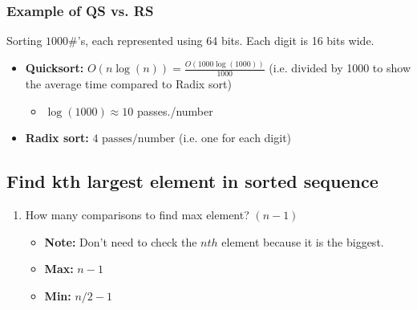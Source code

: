 \subsubsection{Example of QS vs. RS}
\begin{example}
    Sorting $1000\#$'s, each represented using 64 bits. Each digit is 16 bits wide. 
    \begin{itemize}
        \item \textbf{Quicksort:} $O(n \log(n)) = \frac{O(1000 \log(1000))}{1000}$ (i.e. divided by 1000 to show the average time compared to Radix sort)
        \begin{itemize}
            \item $\log(1000) \approx 10$ passes./number
        \end{itemize} 
        \item \textbf{Radix sort:} $4 \text{ passes/number}$ (i.e. one for each digit)
    \end{itemize}
\end{example}

\subsection{Find kth largest element in sorted sequence}
\begin{definition}
    \begin{enumerate}
        \item How many comparisons to find max element? $(n-1)$ 
        \begin{itemize}
            \item \textbf{Note:} Don't need to check the $nth$ element because it is the biggest.
            \item \textbf{Max:} $n-1$
            \item \textbf{Min:} $n/2 - 1$
        \end{itemize}
        
    \end{enumerate}
\end{definition}